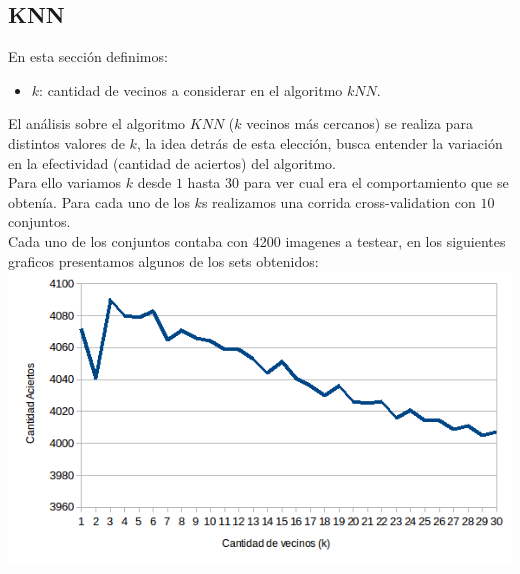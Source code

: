 \subsection{KNN}
En esta sección definimos:
\begin{itemize}
	\item $k$: cantidad de vecinos a considerar en el algoritmo $kNN$.
\end{itemize}
El análisis sobre el algoritmo $KNN$ ($k$ vecinos más cercanos) se realiza para distintos valores de $k$, la idea detrás de esta elección, busca entender la variación en la efectividad (cantidad de aciertos) del algoritmo.
\\
Para ello variamos $k$ desde $1$ hasta $30$ para ver cual era el comportamiento que se obtenía. Para cada uno de los $k$s realizamos una corrida cross-validation con $10$ conjuntos.
\\
Cada uno de los conjuntos contaba con 4200 imagenes a testear, en los siguientes graficos presentamos algunos de los sets obtenidos:
\\
\includegraphics[scale=0.55]{nuevosResultados/knn/1.png}\\

